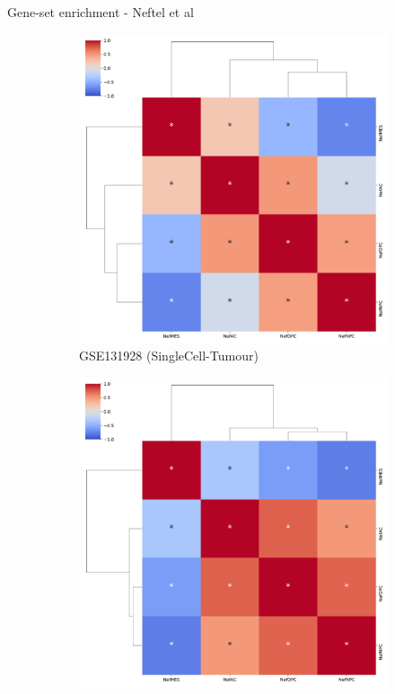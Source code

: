 \documentclass[aspectratio=169,9pt]{beamer}
\begin{document}
    \begin{frame}{Gene-set enrichment - Neftel et al}
        \begin{adjustwidth}{-5cm}{-5cm}
            \centering
            \begin{figure}\ContinuedFloat
                \centering
                \begin{subfigure}[c]{0.48\textwidth}
                    \centering
                    \includegraphics[width=\textwidth]{GSEA_GSM3828672_corrplot_Nef}
                    \caption{GSE131928 (SingleCell-Tumour)}
                \end{subfigure}
                \begin{subfigure}[c]{0.48\textwidth}
                    \centering
                    \includegraphics[width=\textwidth]{GSEA_celllines_corrplot_Nef}

\end{subfigure}
\end{figure}
\end{adjustwidth}
\end{frame}
\end{document}
